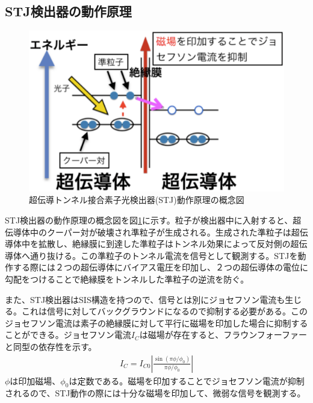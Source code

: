 	\subsection{STJ検出器の動作原理}
		\begin{figure}[htbp]
  			\begin{center}
    				\includegraphics[width=12.0cm]{./Chapter/Chapter2/Picture/STJ_WorkingPrinciple.eps}
    				\caption{超伝導トンネル接合素子光検出器(STJ)動作原理の概念図}
    				\label{fig:STJ_WorkingPrinciple}
  			\end{center}
		\end{figure}
		STJ検出器の動作原理の概念図を図\ref{fig:STJ_WorkingPrinciple}に示す。粒子が検出器中に入射すると、超伝導体中のクーパー対が破壊され準粒子が生成される。生成された準粒子は超伝導体中を拡散し、絶縁膜に到達した準粒子はトンネル効果によって反対側の超伝導体へ通り抜ける。この準粒子のトンネル電流を信号として観測する。STJを動作する際には２つの超伝導体にバイアス電圧を印加し、２つの超伝導体の電位に勾配をつけることで絶縁膜をトンネルした準粒子の逆流を防ぐ。
		
		また、STJ検出器はSIS構造を持つので、信号とは別にジョセフソン電流も生じる。これは信号に対してバックグラウンドになるので抑制する必要がある。このジョセフソン電流は素子の絶縁膜に対して平行に磁場を印加した場合に抑制することができる。ジョセフソン電流$I_C$は磁場が存在すると、フラウンフォーファーと同型の依存性を示す。
		\begin{eqnarray}
			I_{C} = I_{C0} \left| \frac{\sin (\pi \phi / \phi_0)}{\pi \phi / \phi_0} \right|
		\end{eqnarray}
		$\phi$は印加磁場、$\phi_0$は定数である。磁場を印加することでジョセフソン電流が抑制されるので、STJ動作の際には十分な磁場を印加して、微弱な信号を観測する。
	
